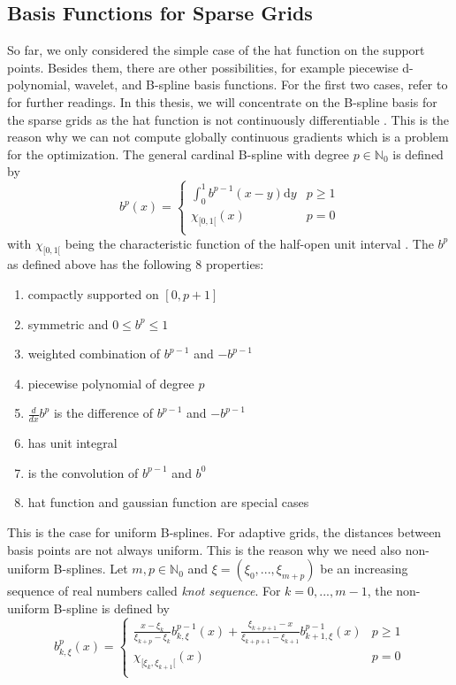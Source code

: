 \subsection{Basis Functions for Sparse Grids}

So far, we only considered the simple case of the hat function on the support points. Besides them, there are other possibilities, for example piecewise d-polynomial, wavelet, and B-spline basis functions. For the first two cases, refer to \cite{pfluger2010spatially, bungartz1998finite, bungartz2004sparse} for further readings. In this thesis, we will concentrate on the B-spline basis for the sparse grids as the hat function is not continuously differentiable \cite{b_splines}. This is the reason why we can not compute globally continuous gradients which is a problem for the optimization. The general cardinal B-spline with degree $ p \in \mathbb{N}_0 $ is defined by 
\begin{equation}
	b^p(x) = \begin{cases} 
				\int_0^1 b^{p-1}(x-y) \text{d}y				& p \geq 1 \\
				\chi_{[0,1[}(x) 							& p=0 \\
			\end{cases}
\end{equation}
with $ \chi_{[0,1[} $ being the characteristic function of the half-open unit interval \cite{hollig2013approximation}. The $ b^p $ as defined above has the following 8 properties:

\begin{enumerate}
	\item compactly supported on $ [0, p+1] $
	\item symmetric and $ 0 \le b^p \le 1 $
	\item weighted combination of $ b^{p-1} $ and $ -b^{p-1} $
	\item piecewise polynomial of degree $ p $
	\item $ \frac{d}{dx} b^p $ is the difference of $ b^{p-1} $ and $ -b^{p-1} $
	\item has unit integral 
	\item is the convolution of $ b^{p-1} $ and $ b^{0} $
	\item hat function and gaussian function are special cases
\end{enumerate}

This is the case for uniform B-splines. For adaptive grids, the distances between basis points are not always uniform. This is the reason why we need also non-uniform B-splines. Let $ m, p \in \mathbb{N}_0 $ and $ \xi = \left(\xi_0, ... , \xi_{m+p}\right) $ be an increasing sequence of real numbers called \textit{knot sequence}. For $ k=0,..., m-1 $, the non-uniform B-spline is defined by 
\begin{equation}
	b^p_{k,\xi}(x) = \begin{cases} 
		\frac{x-\xi_k}{\xi_{k+p}-\xi_k}b^{p-1}_{k,\xi}(x) + \frac{\xi_{k+p+1}-x}{\xi_{k+p+1}-\xi_{k+1}}b^{p-1}_{k+1,\xi}(x)				& p \geq 1 \\
		\chi_{[\xi_{k},\xi_{k+1}[}(x) 							& p=0 \\
	\end{cases}
\end{equation}

